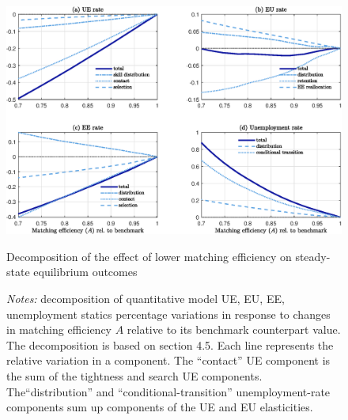 \documentclass[12pt]{article} %
\theoremstyle{plain}
\theoremstyle{definition}
\begin{document}
	\begin{figure}[!h]
		\centering
		\includegraphics[width = 6.5in]{Figure_8.eps} 
		\caption{Decomposition of the effect of lower matching efficiency on steady-state equilibrium outcomes}
		\label{fig:fig_9}
		\caption*{\footnotesize{\textit{Notes:} decomposition of quantitative model UE, EU, EE, unemployment statics percentage variations in response to changes in matching efficiency $A$ relative to its benchmark counterpart value. The decomposition is based on section 4.5. Each line represents the relative variation in a component. The ``contact'' UE component is the sum of the tightness and search UE components. The``distribution'' and ``conditional-transition'' unemployment-rate components sum up components of the UE and EU elasticities.}}
	\end{figure}
	
\end{document}
